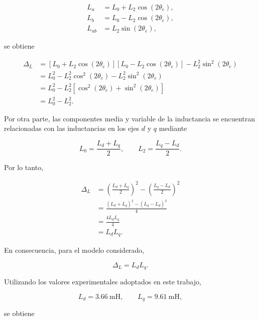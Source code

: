 \begin{align}
    L_a &= L_0 + L_2\cos(2\theta_e), \\
    L_b &= L_0 - L_2\cos(2\theta_e), \\
    L_{ab} &= L_2\sin(2\theta_e),
\end{align}

se obtiene

\begin{align}
    \Delta_L
    &=
    \left[L_0+L_2\cos(2\theta_e)\right]
    \left[L_0-L_2\cos(2\theta_e)\right]
    -
    L_2^2\sin^2(2\theta_e)
    \\
    &=
    L_0^2
    -
    L_2^2\cos^2(2\theta_e)
    -
    L_2^2\sin^2(2\theta_e)
    \\
    &=
    L_0^2
    -
    L_2^2
    \left[
        \cos^2(2\theta_e)
        +
        \sin^2(2\theta_e)
    \right]
    \\
    &=
    L_0^2-L_2^2.
\end{align}

Por otra parte, las componentes media y variable de la inductancia
se encuentran relacionadas con las inductancias en los ejes $d$ y
$q$ mediante

\begin{equation}
    L_0=\frac{L_d+L_q}{2},
    \qquad
    L_2=\frac{L_q-L_d}{2}.
\end{equation}

Por lo tanto,

\begin{align}
    \Delta_L
    &=
    \left(\frac{L_d+L_q}{2}\right)^2
    -
    \left(\frac{L_q-L_d}{2}\right)^2
    \\
    &=
    \frac{
        (L_d+L_q)^2-(L_q-L_d)^2
    }{4}
    \\
    &=
    \frac{4L_dL_q}{4}
    \\
    &=
    L_dL_q.
\end{align}

En consecuencia, para el modelo considerado,

\begin{equation}
    \boxed{
        \Delta_L=L_dL_q
    }.
\end{equation}

Utilizando los valores experimentales adoptados en este trabajo,

\begin{equation}
    L_d=3.66~\mathrm{mH},
    \qquad
    L_q=9.61~\mathrm{mH},
\end{equation}

se obtiene

